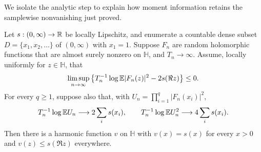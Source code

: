 We isolate the analytic step to explain how moment information retains
the samplewise nonvanishing just proved.

\begin{lemma}
\label{lem:harmonic-selection}
Let $s:(0,\infty)\to\mathbb R$ be locally Lipschitz, and enumerate a
countable dense subset $D=\{x_1,x_2,\ldots\}$ of $(0,\infty)$ with
$x_1=1$.  Suppose
$F_n$ are random holomorphic functions that are almost surely nonzero
on $\mathbb H$, and $T_n\to\infty$.  Assume, locally uniformly for
$z\in\mathbb H$, that
\begin{equation}
 \limsup_{n\to\infty}
   \left\{T_n^{-1}\log\mathbb E|F_n(z)|^2-2s(\Re z)\right\}\le0.
 \label{eq:selection-upper}
\end{equation}
For every $q\ge1$, suppose also that, with
$U_n=\prod_{i=1}^q|F_n(x_i)|^2$,
\begin{equation}
 T_n^{-1}\log\mathbb E U_n\longrightarrow2\sum_i s(x_i),\qquad
 T_n^{-1}\log\mathbb E U_n^2\longrightarrow4\sum_i s(x_i).
 \label{eq:selection-products}
\end{equation}
Then there is a harmonic function $v$ on $\mathbb H$ with
$v(x)=s(x)$ for every $x>0$ and $v(z)\le s(\Re z)$ everywhere.
\end{lemma}

